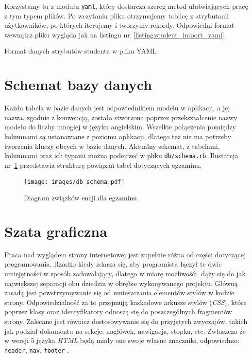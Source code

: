 \documentclass[12pt,twoside]{report}
\begin{document}
Korzystamy tu z modułu \texttt{yaml}, który dostarcza szereg metod ułatwiających pracę z
tym typem plików. Po wczytaniu pliku otrzymujemy tablicę z atrybutami użytkowników, po
których iterujemy i tworzymy rekordy. Odpowiedni format wewnątrz pliku wygląda jak na
listingu nr~\ref{listing:student_import_yaml}.

\begin{listing}
  
  \caption{Format danych atrybutów studenta w pliku YAML}
  \label{listing:student_import_yaml}
\end{listing}

\section{Schemat bazy danych}
Każda tabela w bazie danych jest odpowiednikiem modelu w aplikacji, a jej nazwa, zgodnie z
konwencją, została stworzona poprzez przekształcenie nazwy modelu do liczby mnogiej w
języku angielskim. Wszelkie połączenia pomiędzy kolumnami są ustanawiane z poziomu
aplikacji, dlatego też nie ma potrzeby tworzenia kluczy obcych w bazie danych. Aktualny schemat, z
tabelami, kolumnami oraz ich typami można podejrzeć w pliku \texttt{db/schema.rb}.
Ilustarcja nr~\ref{fig:db_schema} przedstawia strukturę powiązań tabel dotyczących
egzaminu.

\begin{figure}[ht]
  \begin{center}
    \texttt{[image: images/db\_schema.pdf]}
  \end{center}
  \caption{Diagram związków encji dla egzaminu}
  \label{fig:db_schema}
\end{figure}

\section{Szata graficzna}
Praca nad wyglądem strony internetowej jest zupełnie różna od części dotyczącej
programowania. Rzadko kiedy zdarza się, aby programista łączył te dwie umiejętności w
sposób zadowalający, dlatego w miarę możliwośći, dąży się do jak największej separacji obu
dziedzin w obrębie wykonywanego projektu. Główną zasadą jest powstrzymywanie się od
umieszczania elementów stylów w kodzie strony. Odpowiedzialność za to przejmują kaskadowe
arkusze stylów (\emph{CSS}), które poprzez klasy oraz identyfikatory odnoszą się do
poszczególnych fragmentów strony. Zalecane jest również dostosowywanie się do przyjętych
zwyczajów, takich jak podział dokumentu na sekcje: nagłówek, nawigacja, stopka, etc.
Zwłaszcza że w wersji 5 języka \emph{HTML} będą miały one swoje własne znaczniki,
odpowiednio: \texttt{header}, \texttt{nav}, \texttt{footer} \cite{html5}.
\end{document}
